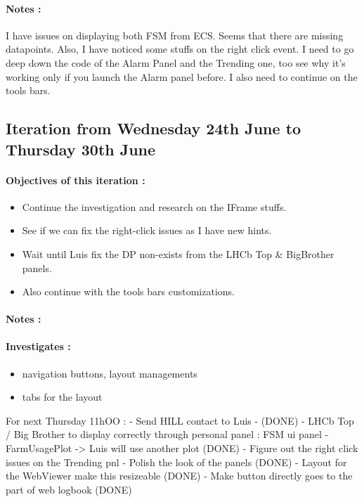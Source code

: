 \documentclass[a4paper, 12pt]{article}
\begin{document}
\begin{appendix}
    \paragraph{Notes :}
    I have issues on displaying both FSM from ECS. Seems that there are missing datapoints. Also, I have noticed some stuffs on the right click event.
    I need to go deep down the code of the Alarm Panel and the Trending one, too see why it's working only if you launch the Alarm panel before.
    I also need to continue on the tools bars.
    \subsection{Iteration from Wednesday 24th June to Thursday 30th June}
    \paragraph{Objectives of this iteration :}
    \begin{itemize}
        \item Continue the investigation and research on the IFrame stuffs.
        \item See if we can fix the right-click issues as I have new hints.
        \item Wait until Luis fix the DP non-exists from the LHCb Top \& BigBrother panels.
        \item Also continue with the tools bars customizations.
    \end{itemize}
    \paragraph{Notes :}
    \paragraph{Investigates :}
    \begin{itemize}
        \item navigation buttons, layout managements
        \item tabs for the layout
    \end{itemize}
    
    For next Thursday 11hOO : 
    - Send HILL contact to Luis - (DONE)
    - LHCb Top / Big Brother to display correctly through personal panel : FSM ui panel
    - FarmUsagePlot -> Luis will use another plot (DONE)
    - Figure out the right click issues on the Trending pnl
    - Polish the look of the panels (DONE)
    - Layout for the WebViewer make this resizeable (DONE)
    - Make button directly goes to the part of web logbook (DONE)
    \newpage

\end{appendix}
\end{document}
